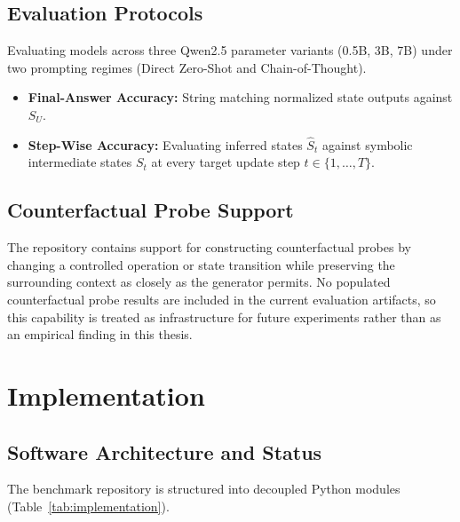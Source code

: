 \documentclass{iutbscthesis}
\begin{document}
\section{Evaluation Protocols}
Evaluating models across three Qwen2.5 parameter variants (\mbox{0.5B}, \mbox{3B}, \mbox{7B}) under two prompting regimes (Direct Zero-Shot and Chain-of-Thought).
\begin{itemize}[noitemsep]
    \item \textbf{Final-Answer Accuracy:} String matching normalized state outputs against $S_U$.
    \item \textbf{Step-Wise Accuracy:} Evaluating inferred states $\hat{S}_t$ against symbolic intermediate states $S_t$ at every target update step $t \in \{1, \dots, T\}$.
\end{itemize}

\section{Counterfactual Probe Support}
The repository contains support for constructing counterfactual probes by changing a controlled operation or state transition while preserving the surrounding context as closely as the generator permits. No populated counterfactual probe results are included in the current evaluation artifacts, so this capability is treated as infrastructure for future experiments rather than as an empirical finding in this thesis.

\chapter{Implementation}

\section{Software Architecture and Status}
The benchmark repository is structured into decoupled Python modules (Table~\ref{tab:implementation}).
\end{document}
